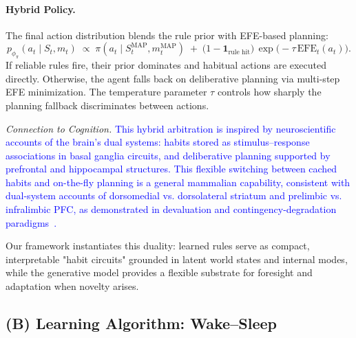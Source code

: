 \documentclass{article} %
\newcommand{\revise}[1]{\textcolor{blue}{#1}}
\begin{document}
\paragraph{Hybrid Policy.}
The final action distribution blends the rule prior with EFE-based planning:
\begin{equation}
\label{eq:policy_blend}
p_{\phi_{\pi}}(a_t\mid S_t,m_t)\;\propto\;
\pi(a_t\mid S_t^{\text{MAP}},m_t^{\text{MAP}})
\;+\;\big(1-\mathbf{1}_{\text{rule hit}}\big)\,\exp\!\big(-\tau\,\text{EFE}_t(a_t)\big).
\end{equation}
If reliable rules fire, their prior dominates and habitual actions are executed directly.  
Otherwise, the agent falls back on deliberative planning via multi-step EFE minimization.  
The temperature parameter \(\tau\) controls how sharply the planning fallback discriminates between actions.  

{\it Connection to Cognition.} \revise{This hybrid arbitration is inspired by neuroscientific accounts of the brain's dual systems: habits stored as stimulus--response associations in basal ganglia circuits, and deliberative planning supported by prefrontal and hippocampal structures. This flexible switching between cached habits and on-the-fly planning is a general mammalian capability, consistent with dual-system accounts of dorsomedial vs. dorsolateral striatum and prelimbic vs. infralimbic PFC, as demonstrated in devaluation and contingency-degradation paradigms~\citep{dolan2013goals, cushman2015habitual}.}

Our framework instantiates this duality: learned rules serve as compact, interpretable "habit circuits" grounded in latent world states and internal modes, while the generative model provides a flexible substrate for foresight and adaptation when novelty arises.  


\subsection{(B) Learning Algorithm: Wake--Sleep}
\label{subsec:wake_sleep_learning}
\end{document}
